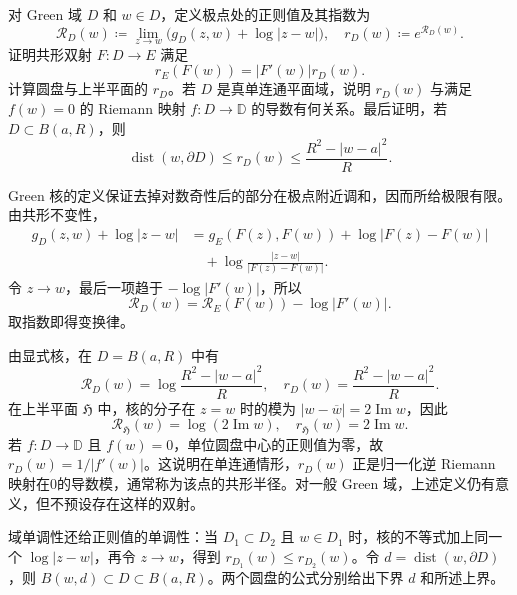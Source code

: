 \begin{exercise}[正则值与共形半径]\label{b3:ex:17-draft-01}
对 Green 域 \(D\) 和 \(w\in D\)，定义极点处的正则值及其指数为
\[
 \mathcal R_D(w)\coloneqq
 \lim_{z\to w}\bigl(g_D(z,w)+\log|z-w|\bigr),\quad
 r_D(w)\coloneqq e^{\mathcal R_D(w)}.
\]
证明共形双射 \(F:D\to E\) 满足
\[
 r_E(F(w))=|F'(w)|r_D(w).
\]
计算圆盘与上半平面的 \(r_D\)。若 \(D\) 是真单连通平面域，说明 \(r_D(w)\) 与满足 \(f(w)=0\) 的 Riemann 映射 \(f:D\to\mathbb D\) 的导数有何关系。最后证明，若 \(D\subset B(a,R)\)，则
\[
 \operatorname{dist}(w,\partial D)
 \le r_D(w)\le\frac{R^2-|w-a|^2}{R}.
\]
\end{exercise}
\begin{solution}
Green 核的定义保证去掉对数奇性后的部分在极点附近调和，因而所给极限有限。由共形不变性，
\begin{align*}
 g_D(z,w)+\log|z-w|
 &=g_E(F(z),F(w))+\log|F(z)-F(w)|\\
 &\quad+\log\frac{|z-w|}{|F(z)-F(w)|}.
\end{align*}
令 \(z\to w\)，最后一项趋于 \(-\log|F'(w)|\)，所以
\[
 \mathcal R_D(w)=\mathcal R_E(F(w))-\log|F'(w)|.
\]
取指数即得变换律。

由显式核，在 \(D=B(a,R)\) 中有
\[
 \mathcal R_D(w)=\log\frac{R^2-|w-a|^2}{R},\quad
 r_D(w)=\frac{R^2-|w-a|^2}{R}.
\]
在上半平面 \(\mathfrak H\) 中，核的分子在 \(z=w\) 时的模为 \(|w-\overline w|=2\operatorname{Im}w\)，因此
\[
 \mathcal R_{\mathfrak H}(w)=\log(2\operatorname{Im}w),\quad
 r_{\mathfrak H}(w)=2\operatorname{Im}w.
\]
若 \(f:D\to\mathbb D\) 且 \(f(w)=0\)，单位圆盘中心的正则值为零，故 \(r_D(w)=1/|f'(w)|\)。这说明在单连通情形，\(r_D(w)\) 正是归一化逆 Riemann 映射在0的导数模，通常称为该点的共形半径。对一般 Green 域，上述定义仍有意义，但不预设存在这样的双射。

域单调性还给正则值的单调性：当 \(D_1\subset D_2\) 且 \(w\in D_1\) 时，核的不等式加上同一个 \(\log|z-w|\)，再令 \(z\to w\)，得到 \(r_{D_1}(w)\le r_{D_2}(w)\)。令 \(d=\operatorname{dist}(w,\partial D)\)，则 \(B(w,d)\subset D\subset B(a,R)\)。两个圆盘的公式分别给出下界 \(d\) 和所述上界。
\end{solution}

